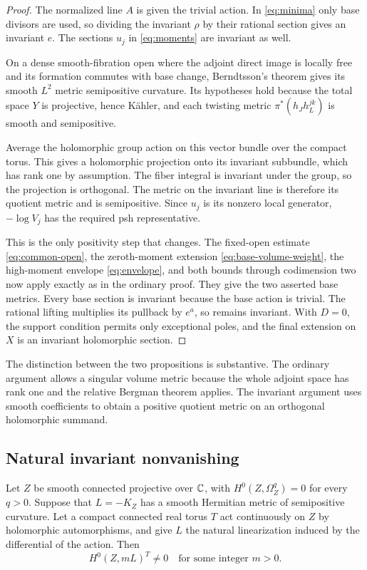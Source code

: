 \begin{proof}
The normalized line \(A\) is given the trivial action.
In \eqref{eq:minima} only base divisors are used, so dividing the
invariant \(\rho\) by their rational section gives an invariant \(e\).
The sections \(u_j\) in \eqref{eq:moments} are invariant as well.

On a dense smooth-fibration open where the adjoint direct image is
locally free and its formation commutes with base change, Berndtsson's theorem
\cite[Theorem~1.2]{Berndtsson2009} gives its smooth \(L^2\) metric
semipositive curvature. Its hypotheses hold because the total space
\(Y\) is projective, hence K\"ahler, and each twisting metric
\(\pi^*(h_Jh_L^{jk})\) is smooth and semipositive.

Average the holomorphic group action on this vector bundle over
the compact torus. This gives a holomorphic projection onto its
invariant subbundle, which has rank one by assumption.
The fiber integral is invariant under the group, so the projection
is orthogonal. The metric on the invariant line is therefore its
quotient metric and is semipositive. Since \(u_j\) is its nonzero
local generator, \(-\log V_j\) has the required psh representative.

This is the only positivity step that changes. The fixed-open
estimate \eqref{eq:common-open}, the zeroth-moment extension
\eqref{eq:base-volume-weight}, the high-moment envelope
\eqref{eq:envelope}, and both bounds through codimension two
now apply exactly as in the ordinary proof.
They give the two asserted base metrics.
Every base section is invariant because the base action is trivial.
The rational lifting multiplies its pullback by \(e^a\), so remains
invariant. With \(D=0\), the support condition permits only
exceptional poles, and the final extension on \(X\) is an invariant
holomorphic section.
\end{proof}

The distinction between the two propositions is substantive.
The ordinary argument allows a singular volume metric because the
whole adjoint space has rank one and the relative Bergman theorem
applies. The invariant argument uses smooth coefficients to obtain
a positive quotient metric on an orthogonal holomorphic summand.

\subsection{Natural invariant nonvanishing}

\begin{theorem}\label{thm:invariant}
Let $Z$ be smooth connected projective over $\mathbb C$, with
$H^0(Z,\Omega_Z^q)=0$ for every $q>0$. Suppose that
$L=-K_Z$ has a smooth Hermitian metric of semipositive curvature.
Let a compact connected real torus $T$ act continuously on $Z$ by
holomorphic automorphisms, and give $L$ the natural linearization
induced by the differential of the action. Then
\[
                  H^0(Z,mL)^T\ne0
                  \quad\text{for some integer }m>0.
\]
\end{theorem}

